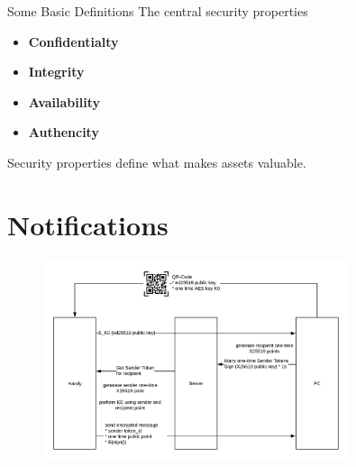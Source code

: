 \documentclass[aspectratio=169]{beamer}
\begin{document}
  \begin{frame}{Some Basic Definitions}
    The central security properties
    \begin{itemize}
      \item \textbf{Confidentialty} 
      \pause
      \item \textbf{Integrity} 
      \pause
      \item \textbf{Availability} 
      \pause
      \item \textbf{Authencity} 
      \pause
    \end{itemize}
    Security properties define what makes assets valuable.
  \end{frame}

\section{Notifications}

  \begin{frame}
    \begin{figure}
      \centering
      \includegraphics[width=0.8\textwidth]{figures/overview}
    \end{figure}
  \end{frame}

  \maketitle
%    
%    
\end{document}
